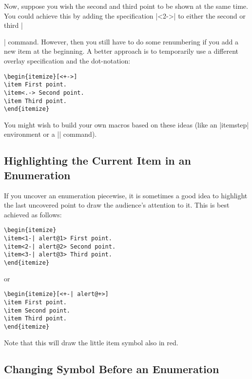 Now, suppose you wish the second and third point to be shown at the same time. You could achieve this by adding the specification |<2->| to either the second or third |\item| command. However, then you still have to do some renumbering if you add a new item at the beginning. A better approach is to temporarily use a different overlay specification and the dot-notation:
\begin{verbatim}
\begin{itemize}[<+->]
\item First point.
\item<.-> Second point.
\item Third point.
\end{itemize}
\end{verbatim}

You might wish to build your own macros based on these ideas (like an |itemstep| environment or a |\itemlikeprevious| command).


\subsection{Highlighting the Current Item in an Enumeration}

If you uncover an enumeration piecewise, it is sometimes a good idea to highlight the last uncovered point to draw the audience's attention to it. This is best achieved as follows:
\begin{verbatim}
\begin{itemize}
\item<1-| alert@1> First point.
\item<2-| alert@2> Second point.
\item<3-| alert@3> Third point.
\end{itemize}
\end{verbatim}

or
\begin{verbatim}
\begin{itemize}[<+-| alert@+>]
\item First point.
\item Second point.
\item Third point.
\end{itemize}
\end{verbatim}

Note that this will draw the little item symbol also in red.


\subsection{Changing Symbol Before an Enumeration}

